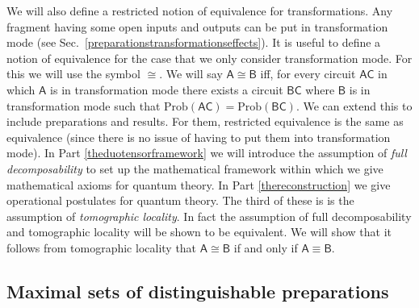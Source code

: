 \documentclass[10pt]{article}
\begin{document}
We will also define a restricted notion of equivalence for transformations.  Any fragment having some open inputs and outputs can be put in transformation mode (see Sec.\ \ref{preparationstransformationseffects}).  It is useful to define a notion of equivalence for the case that we only consider transformation mode.  For this we will use the symbol $\cong$.  We will say $\mathsf A\cong \mathsf B$ iff, for every circuit $\mathsf{AC}$ in which $\mathsf A$ is in transformation mode there exists a circuit $\mathsf{BC}$ where $\mathsf B$ is in transformation mode such that $\text{Prob}(\mathsf{AC})=\text{Prob}(\mathsf{BC})$.   We can extend this to include preparations and results.  For them, restricted equivalence is the same as equivalence (since there is no issue of having to put them into transformation mode).  In Part \ref{theduotensorframework} we will introduce the assumption of \emph{full decomposability} to set up the mathematical framework within which we give mathematical axioms for quantum theory.   In Part \ref{thereconstruction} we give operational postulates for quantum theory. The third of these is is the assumption of \emph{tomographic locality}.  In fact the assumption of full decomposability and tomographic locality will be shown to be equivalent.  We will show that it follows from tomographic locality that $\mathsf{A\cong B}$ if and only if $\mathsf{A\equiv B}$.





\subsection{Maximal sets of distinguishable preparations}\label{maximalsetsofdistinguishablepreps}
\end{document}
